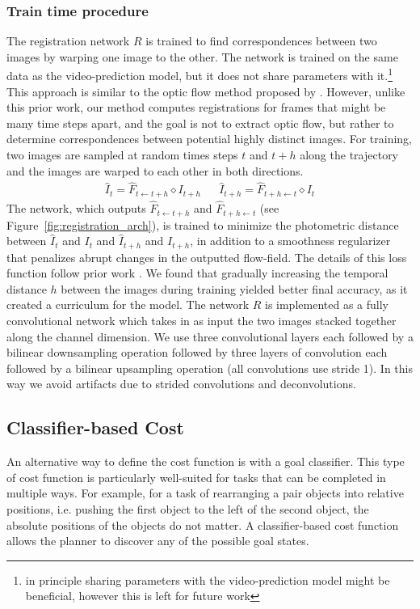 \subsubsection{Train time procedure}
The registration network $R$ is trained to find correspondences between two images by warping one image to the other. The network is trained on the same data as the video-prediction model, but it does not share parameters with it.\footnote{in principle sharing parameters with the video-prediction model might be beneficial, however this is left for future work} This approach is similar to the optic flow method proposed by \cite{meister2017unflow}. However, unlike this prior work, our method computes registrations for frames that might be many time steps apart, and the goal is not to extract optic flow, but rather to determine correspondences between potential highly distinct images. For training, two images are sampled at random times steps $t$ and $t+h$ along the trajectory and the images are warped to each other in both directions. 
\begin{align}
     \hat{I}_{t} = \hat{F}_{t \leftarrow t +h} \diamond  I_{t+h} &&
     \hat{I}_{t+h} = \hat{F}_{t+h \leftarrow t} \diamond  I_{t}
\end{align}
The network, which outputs $\hat{F}_{t \leftarrow t +h}$ and $\hat{F}_{t+h \leftarrow t}$ (see Figure~\ref{fig:registration_arch}), is trained to minimize the photometric distance between $\hat{I}_t$ and $I_t$ and $\hat{I}_{t+h}$ and $I_{t+h}$, in addition to a smoothness regularizer that penalizes abrupt changes in the outputted flow-field. The details of this loss function follow prior work \cite{meister2017unflow}. We found that gradually increasing the temporal distance $h$ between the images during training yielded better final accuracy, as it created a curriculum for the model. The network $R$ is implemented as a fully convolutional network which takes in as input the two images stacked together along the channel dimension. We use three convolutional layers each followed by a bilinear downsampling operation followed by three layers of convolution each followed by a bilinear upsampling operation (all convolutions use stride 1). In this way we avoid artifacts due to strided convolutions and deconvolutions.


\subsection{Classifier-based Cost}
\label{subsec:class_cost}
An alternative way to define the cost function is with a goal classifier. This type of cost function is particularly well-suited for tasks that can be completed in multiple ways. For example, for a task of rearranging a pair objects into relative positions, i.e. pushing the first object to the left of the second object, the absolute positions of the objects do not matter. A classifier-based cost function allows the planner to discover any of the possible goal states.

